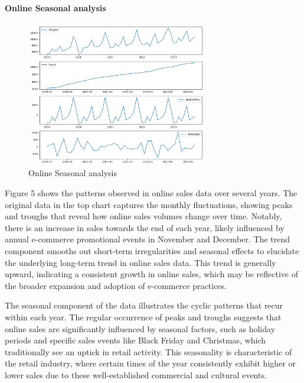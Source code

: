 \documentclass{article}
\begin{document}
\paragraph{Online Seasonal analysis}
\begin{figure}[h]
  \centering
  \includegraphics[width=0.7\textwidth]{Seasonal_analysis_online.png}
  \caption{Online Seasonal analysis}
  \label{fig:yourlabel}
\end{figure}

Figure 5 shows the patterns observed in online sales data over several years. The original data in the top chart captures the monthly fluctuations, showing peaks and troughs that reveal how online sales volumes change over time. Notably, there is an increase in sales towards the end of each year, likely influenced by annual e-commerce promotional events in November and December.
The trend component smooths out short-term irregularities and seasonal effects to elucidate the underlying long-term trend in online sales data. This trend is generally upward, indicating a consistent growth in online sales, which may be reflective of the broader expansion and adoption of e-commerce practices.

The seasonal component of the data illustrates the cyclic patterns that recur within each year. The regular occurrence of peaks and troughs suggests that online sales are significantly influenced by seasonal factors, such as holiday periods and specific sales events like Black Friday and Christmas, which traditionally see an uptick in retail activity. This seasonality is characteristic of the retail industry, where certain times of the year consistently exhibit higher or lower sales due to these well-established commercial and cultural events.
\end{document}
